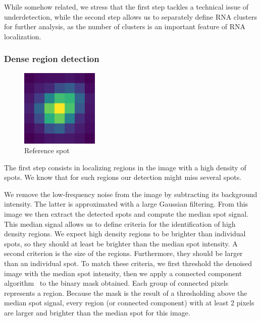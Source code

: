 While somehow related, we stress that the first step tackles a technical issue of underdetection, while the second step allows us to separately define \ac{RNA} clusters for further analysis, as the number of clusters is an important feature of \ac{RNA} localization.

\subsubsection{Dense region detection}

\begin{figure}
	\begin{center}
		\includegraphics[width=0.33\textwidth]{figures/chapter2/reference_spot}
	\caption[Reference spot]{Reference spot}
	\label{fig:reference_spot}
	\end{center}
\end{figure}

The first step consists in localizing regions in the image with a high density of spots.
We know that for such regions our detection might miss several spots.

We remove the low-frequency noise from the image by subtracting its background intensity.
The latter is approximated with a large Gaussian filtering.
From this image we then extract the detected spots and compute the median spot signal.
This median signal allows us to define criteria for the identification of high density regions.
We expect high density regions to be brighter than individual spots, so they should at least be brighter than the median spot intensity.
A second criterion is the size of the regions.
Furthermore, they should be larger than an individual spot.
To match these criteria, we first threshold the denoised image with the median spot intensity, then we apply a connected component algorithm~\cite{wu_connected_component_2005} to the binary mask obtained.
Each group of connected pixels represents a region.
Because the mask is the result of a thresholding above the median spot signal, every region (or connected component) with at least 2 pixels are larger and brighter than the median spot for this image.

